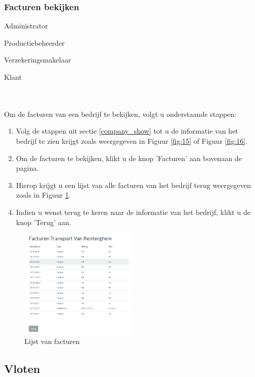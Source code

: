\documentclass[11pt,openany]{article}
\newcommand{\cmark}{\ding{51}}%
\newcommand{\done}{\rlap{$\square$}{\raisebox{2pt}{\large\hspace{1pt}\cmark}}%
	\hspace{-2.5pt}}
\begin{document}
\subsubsection{Facturen bekijken}

\label{company_invoice_show}
 \begin{todolist}
 	\item[\done] Administrator
 	\item[\done] Productiebeheerder
 	\item[\done] Verzekeringsmakelaar
 	\item[\done] Klant 
 \end{todolist}
 \\
 \\
 Om de facturen van een bedrijf te bekijken, volgt u onderstaande stappen:
 \begin{enumerate}
 	\item Volg de stappen uit sectie \ref{company_show} tot u de informatie van het bedrijf te zien krijgt zoals weergegeven in Figuur \ref{fig:15} of Figuur \ref{fig:16}.
 	\item Om de facturen te bekijken, klikt u de knop 'Facturen' aan bovenaan de pagina.
 	\item Hierop krijgt u een lijst van alle facturen van het bedrijf terug weergegeven zoals in Figuur \ref{fig:19}.
 	\item Indien u wenst terug te keren naar de informatie van het bedrijf, klikt u de knop 'Terug' aan.
 \end{enumerate}

\begin{figure}
	\centering
	\includegraphics[width=0.5\textwidth]{img/fig19.png}
	\caption{Lijst van facturen} 
	\label{fig:19} 
\end{figure}
\newpage
\subsection{Vloten}
\label{fleets}
\end{document}
